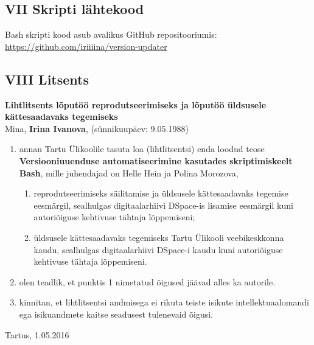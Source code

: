 \documentclass[12pt]{article}
\begin{document}
  \subsection*{VII Skripti lähtekood}
  \label{source-code}
  
  Bash skripti kood asub avalikus GitHub repositooriumis:\\
  \url{https://github.com/iriiiina/version-updater}
  
  \newpage

  \subsection*{VIII Litsents}
  \label{licence}
  
  \textbf{Lihtlitsents lõputöö reprodutseerimiseks ja lõputöö üldsusele kättesaadavaks tegemiseks}\\
  
  Mina, \textbf{Irina Ivanova}, (sünnikuupäev: 9.05.1988)
  \begin{enumerate}
    \item annan Tartu Ülikoolile tasuta loa (lihtlitsentsi) enda loodud teose \textbf{Versiooniuuenduse automatiseerimine kasutades skriptimiskeelt Bash}, mille juhendajad on Helle Hein ja Polina Morozova,
    \begin{enumerate}
      \item reprodutseerimiseks säilitamise ja üldsusele kättesaadavaks tegemise eesmärgil, sealhulgas digitaalarhiivi DSpace-is lisamise eesmärgil kuni autoriõiguse kehtivuse tähtaja lõppemiseni;
      \item üldsusele kättesaadavaks tegemiseks Tartu Ülikooli veebikeskkonna kaudu, sealhulgas digitaalarhiivi DSpace-i kaudu kuni autoriõiguse kehtivuse tähtaja lõppemiseni.
    \end{enumerate}
    \item olen teadlik, et punktis 1 nimetatud õigused jäävad alles ka autorile.
    \item kinnitan, et lihtlitsentsi andmisega ei rikuta teiste isikute intellektuaalomandi ega isikuandmete kaitse seadusest tulenevaid õigusi.
  \end{enumerate}
  
  Tartus, 1.05.2016
\end{document}
